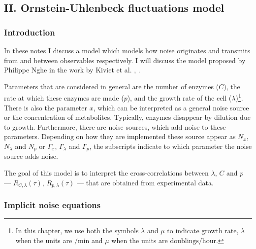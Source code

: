 


\subsection*{II. Ornstein-Uhlenbeck fluctuations model}

\subsubsection*{Introduction}

In these notes I discuss a model which models how noise originates and transmits from and between observables respectively. I will discuss the model proposed by Philippe Nghe in the work by Kiviet et al. \cite{Kiviet2014}, .

Parameters that are considered in general are the number of enzymes ($C$), the rate at which these enzymes are made ($p$), and the growth rate of the cell ($\lambda$)\footnote{
    In this chapter, we use both the symbols $\lambda$ and $\mu$ to indicate growth rate,
    $\lambda$ when the units are $/\text{min}$ and
    $\mu$ when the units are $\text{doublings}/\text{hour}$.}.
There is also the parameter $x$, which can be interpreted as a general noise source or the concentration of metabolites. Typically, enzymes disappear by dilution due to growth. Furthermore, there are noise sources, which add noise to these parameters. Depending on how they are implemented these source appear as $N_x$, $N_\lambda$ and $N_p$ or $\Gamma_x$, $\Gamma_\lambda$ and $\Gamma_p$, the subscripts indicate to which parameter the noise source adds noise.

The goal of this model is to interpret the cross-correlations between $\lambda$, $C$ and $p$ --- $R_{C,\lambda}(\tau)$, $R_{p,\lambda}(\tau)$ --- that are obtained from experimental data.

\subsubsection*{Implicit noise equations}


